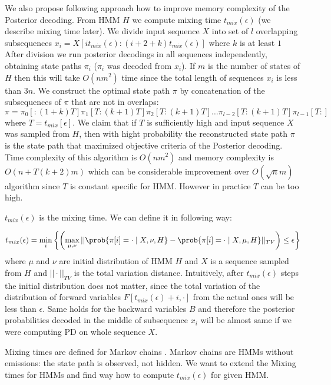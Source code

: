 We also propose following approach how to improve memory complexity of the
Posterior decoding. From HMM $H$ we compute mixing time
$t_{mix}(\epsilon)$ (we describe mixing time later).  We divide input sequence
$X$ into set of $l$ overlapping subsequences
$x_i=X[it_{mix}(\epsilon):(i+2+k)t_{mix}(\epsilon)]$ where $k$ is at least $1$
After division we run posterior decodings in all sequences
independently, obtaining state paths $\pi_i$ ($\pi_i$ was decoded from $x_i$). If $m$ is the number of states of $H$ then this will
take $O(nm^2)$ time since the total length of sequences $x_i$ is less than $3n$.
We construct the optimal state path $\pi$ by concatenation of the subsequences
of $\pi$ that are not in overlaps:
\[\pi = \pi_0[:(1+k)T] \pi_1[T:(k+1)T] \pi_2[T:(k+1)T] \dots
\pi_{l-2}[T:(k+1)T] \pi_{l-1}[T:]\] where $T=t_{mix}[\epsilon]$. We claim that
if $T$ is sufficiently high and input sequence $X$ was sampled from $H$, then
with hight probability the reconstructed state path $\pi$ is the state path that
maximized objective criteria of the Posterior decoding.
Time complexity of this algorithm is $O(nm^2)$ and memory complexity is
$O(n+T(k+2)m)$ which can be considerable improvement over $O(\sqrt n m)$
algorithm since $T$ is constant specific for HMM. However in practice $T$ can be
too high.

\def\tmix{t_{mix}(\epsilon)}

$\tmix$ is the mixing time. We can define it in following way:

\[\tmix = \min_{i}\left\{ 
\left(\max_{\mu,\nu} || \prob{\pi[i] = \cdot\mid X,\nu,H} - \prob{\pi[i] = \cdot\mid
X,\mu,H}||_{TV}\right)\leq \epsilon
\right\}
\] 
where $\mu$ and $\nu$ are initial distribution of HMM $H$ and $X$ is a sequence
sampled from $H$ and $||\cdot||_{TV}$ is the total variation distance.
Intuitively, after $\tmix$ steps the initial distribution does not matter, since
the total variation of the distribution of forward variables $F[\tmix+i,\cdot]$
from the actual ones will be less than $\epsilon$. Same holds for the backward
variables $B$ and therefore the posterior probabilities decoded in the middle of
subsequence $x_i$ will be almost same if we were computing PD on whole sequence
$X$.

Mixing times are defined for Markov chains \cite{Levin2006}. Markov chains are
HMMs without emissions: the state path is observed, not hidden. We want to
extend the Mixing times for HMMs and find way how to compute $\tmix$ for given
HMM.




